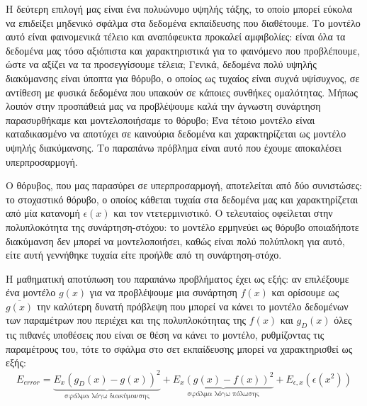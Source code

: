 \documentclass{article}
\begin{document}
 Η δεύτερη επιλογή μας είναι ένα πολυώνυμο υψηλής τάξης, το οποίο μπορεί εύκολα να επιδείξει μηδενικό σφάλμα στα δεδομένα εκπαίδευσης που διαθέτουμε. Το μοντέλο αυτό είναι φαινομενικά τέλειο και αναπόφευκτα προκαλεί αμφιβολίες: είναι όλα τα δεδομένα μας τόσο αξιόπιστα και χαρακτηριστικά για το φαινόμενο που προβλέπουμε, ώστε να αξίζει να τα προσεγγίσουμε τέλεια; Γενικά, δεδομένα πολύ υψηλής διακύμανσης είναι ύποπτα για θόρυβο, ο οποίος ως τυχαίος είναι συχνά υψίσυχνος, σε αντίθεση με φυσικά δεδομένα που υπακούν σε κάποιες συνθήκες ομαλότητας. Μήπως λοιπόν στην προσπάθειά μας να προβλέψουμε καλά την άγνωστη συνάρτηση παρασυρθήκαμε και μοντελοποιήσαμε το θόρυβο; Ένα τέτοιο μοντέλο είναι καταδικασμένο να αποτύχει σε καινούρια δεδομένα και χαρακτηρίζεται ως μοντέλο υψηλής διακύμανσης. Το παραπάνω πρόβλημα είναι αυτό που έχουμε αποκαλέσει υπερπροσαρμογή.
 
Ο θόρυβος, που μας παρασύρει σε υπερπροσαρμογή, αποτελείται από δύο συνιστώσες: το στοχαστικό θόρυβο, ο οποίος κάθεται τυχαία στα δεδομένα μας και χαρακτηρίζεται από μία κατανομή $\epsilon(x)$ και τον ντετερμινιστικό. Ο τελευταίος οφείλεται στην πολυπλοκότητα της συνάρτηση-στόχου: το μοντέλο ερμηνεύει ως θόρυβο οποιαδήποτε διακύμανση δεν μπορεί να μοντελοποιήσει, καθώς είναι πολύ πολύπλοκη για αυτό, είτε αυτή γεννήθηκε τυχαία είτε προήλθε από τη συνάρτηση-στόχο.

Η μαθηματική αποτύπωση του παραπάνω προβλήματος έχει ως εξής: αν επιλέξουμε ένα μοντέλο $g(x)$ για να προβλέψουμε μια συνάρτηση $f(x)$ και ορίσουμε ως $\bar{g(x)}$ την καλύτερη δυνατή πρόβλεψη που μπορεί να κάνει το μοντέλο δεδομένων των παραμέτρων που περιέχει και της πολυπλοκότητας της $f(x)$ και $g_D(x)$ όλες τις πιθανές υποθέσεις που είναι σε θέση να κάνει το μοντέλο, ρυθμίζοντας τις παραμέτρους του, τότε το σφάλμα στο σετ εκπαίδευσης μπορεί να χαρακτηρισθεί ως εξής:
$$E_{error}=\underbrace{E_x(g_D(x) - g(x))^2}_{\text{σφάλμα λόγω  διακύμανσης}} + \underbrace{E_x(g(x)- f(x))^2}_{\text{σφάλμα λόγω πόλωσης}} + E_{\epsilon,x}(\epsilon(x^2))$$
\end{document}

